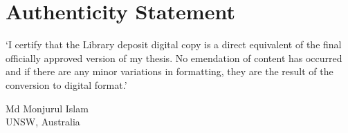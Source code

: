 
\chapter*{Authenticity Statement}
\pagestyle{plain}

`I certify that the Library deposit digital copy is a direct equivalent of the final officially approved version of my thesis. No emendation of content has occurred and if there are any minor variations in formatting, they are the result of the conversion to digital format.'

\vspace{60pt}

\begin{flushright}
Md Monjurul Islam \\
UNSW, Australia
\end{flushright}
